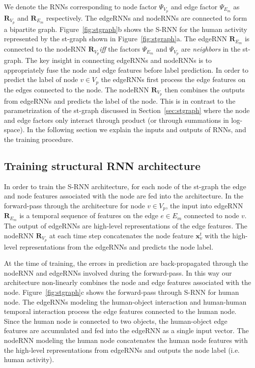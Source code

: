 \documentclass[10pt,twocolumn,letterpaper]{article}
\newcommand{\ve}[1]{\mathbf{#1}}
\begin{document}
We denote the RNNs corresponding to node factor $\Psi_{V_p}$ and edge factor $\Psi_{E_m}$ as  $\ve{R}_{V_p}$ and $\ve{R}_{E_m}$ respectively. The edgeRNNs and nodeRNNs are connected to form a bipartite graph. Figure~\ref{fig:stgraph}b shows the S-RNN for the human activity represented by the st-graph shown in  Figure~\ref{fig:stgraph}a. The edgeRNN $\ve{R}_{E_m}$ is connected to the nodeRNN $\ve{R}_{V_p}$\textit{iff} the factors $\Psi_{E_m}$  and $\Psi_{V_p}$ are \textit{neighbors} in the st-graph. The key insight in connecting edgeRNNs and nodeRNNs is to appropriately fuse the node and edge features before label prediction. In order to predict the label of node $v \in V_p$ the edgeRNNs first process the edge features on the edges connected to the node. The nodeRNN $\ve{R}_{V_p}$ then combines the outputs from edgeRNNs and predicts the label of the node. This is in contrast to the parametrization of the st-graph discussed in Section~\ref{sec:stgraph} where the node and edge factors only interact through product (or through summations in log-space). In the following section we explain the inputs and outputs of RNNs, and the training procedure.

\subsection{Training structural RNN architecture}

In order to train the S-RNN architecture, for each node of the st-graph the edge and node features associated with the node are fed into the architecture.  In the forward-pass through the architecture for node $v \in V_p$, the input into edgeRNN $\ve{R}_{E_m}$ is a temporal sequence of features on the edge $e \in E_m$ connected to node $v$. The output of edgeRNNs are high-level representations of the edge features.  The nodeRNN $\ve{R}_{V_p}$ at each time step  concatenates the node feature $\ve{x}_v^t$ with the high-level representations from the edgeRNNs and predicts the node label. 

At the time of training, the errors in prediction are back-propagated through the nodeRNN and edgeRNNs involved during the forward-pass. In this way our architecture non-linearly combines the node and edge features associated with the node.  Figure~\ref{fig:stgraph}c shows the forward-pass through S-RNN for human node. The edgeRNNs modeling the human-object interaction and human-human temporal interaction process the edge features connected to the human node. Since the human node is connected to two objects, the human-object edge features are accumulated and fed into the edgeRNN as a single input vector. The nodeRNN modeling the human node concatenates the human node features with the high-level representations from edgeRNNs and outputs the node label (i.e. human activity).
\end{document}

